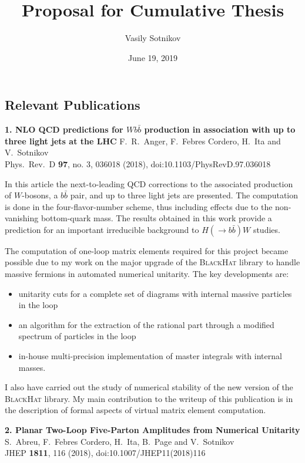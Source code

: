 \documentclass[a4paper,10pt]{article}
\title{\vspace{-2cm}Proposal for Cumulative Thesis}
\date{\vspace{-2ex}June 19, 2019}
\author{\vspace{-1ex}Vasily Sotnikov}
\newcommand{\paper}[1]{\vspace{3ex}\noindent\large\textbf{#1}\newline}
\begin{document}
\maketitle


\subsection*{Relevant Publications}
\vspace{-3ex}

\paper{1. NLO QCD predictions for $Wb\bar b$ production in association with up to three light jets at the LHC}
  F.~R.~Anger, F.~Febres Cordero, H.~Ita and V.~Sotnikov\\
  Phys.\ Rev.\ D {\bf 97}, no. 3, 036018 (2018), doi:10.1103/PhysRevD.97.036018

  In this article the next-to-leading QCD corrections to the associated production of $W$-bosons, a $b\bar{b}$ pair, and up to three light jets are presented.
  The computation is done in the four-flavor-number scheme, thus including effects due to the non-vanishing bottom-quark mass.
  The results obtained in this work provide a prediction for an important irreducible background to $H(\to b\bar{b})W$ studies.

  The computation of one-loop matrix elements required for this project became possible
  due to my work on the major upgrade of the \textsc{BlackHat} library to handle massive fermions in automated numerical unitarity.
  The key developments are:
  \begin{itemize}
    \item unitarity cuts for a complete set of diagrams with internal massive particles in the loop
    \item an algorithm for the extraction of the rational part through a modified spectrum of particles in the loop
    \item in-house multi-precision implementation of master integrals with internal masses.
  \end{itemize}
  I also have carried out the study of numerical stability of the new version of the \textsc{BlackHat} library.
  My main contribution to the writeup of this publication is in the description of formal aspects of virtual matrix element computation.


\paper{2. Planar Two-Loop Five-Parton Amplitudes from Numerical Unitarity}
  S.~Abreu, F.~Febres Cordero, H.~Ita, B.~Page and V.~Sotnikov\\
JHEP {\bf 1811}, 116 (2018), doi:10.1007/JHEP11(2018)116
\end{document}
